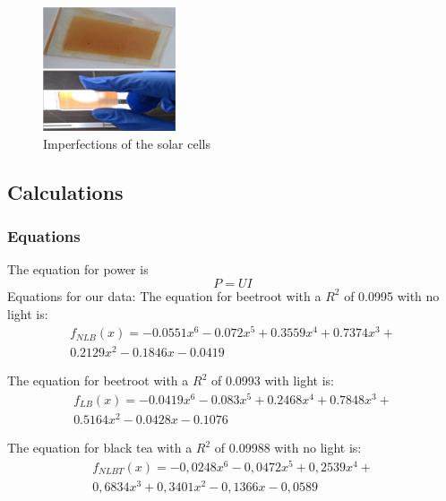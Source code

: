 \documentclass[conference]{IEEEtran}
\begin{document}
\begin{figure}[H]
\centering
\includegraphics[width=0.35\textwidth]{combined.png}
\caption{Imperfections of the solar cells}
\label{fig:resultteabeet} %
\end{figure}
\subsection{Calculations}

\subsubsection{Equations}
The equation for power is \begin{equation} \label{eq:power} P = UI \end{equation}
Equations for our data:
The equation for beetroot with a $R^2$ of 0.0995 with no light is: 
\begin{equation} \label{eq:redbeetnolighteq} 
\begin{aligned}
f_{NLB}(x) = -0.0551x^6 - 0.072x^5 + 0.3559x^4 + 0.7374x^3 +\\ 0.2129x^2 -0.1846x - 0.0419
\end{aligned}
\end{equation}

\noindent The equation for beetroot with a $R^2$ of 0.0993 with light is: 
\begin{equation} \label{eq:redbeetlighteq}
\begin{aligned}
f_{LB}(x) = -0.0419x^6 - 0.083x^5 + 0.2468x^4 + 0.7848x^3 +\\ 0.5164x^2 - 0.0428x - 0.1076
\end{aligned}
\end{equation}

\noindent The equation for black tea with a $R^2$ of 0.09988 with no light is: 
\begin{equation} \label{eq:blackteanolighteq} 
\begin{aligned}
f_{NLBT}(x) = -0,0248x^6 - 0,0472x^5 + 0,2539x^4 + \\0,6834x^3 + 0,3401x^2 - 0,1366x - 0,0589
\end{aligned}
\end{equation}
\end{document}
